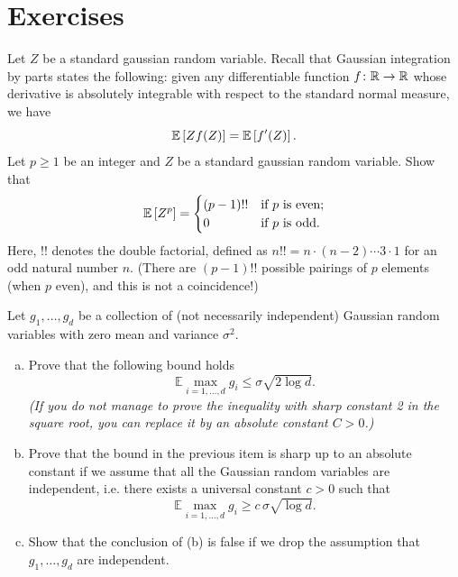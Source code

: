 \section*{Exercises}


\begin{myexercise}
    \label{prob:gaussian_moments}
    Let $Z$ be a standard gaussian random variable. Recall that Gaussian integration by parts states the following:
    given any differentiable function $f \colon \mathbb{R} \to \mathbb{R}$ whose derivative is absolutely integrable with respect to the standard normal measure, we have
    \begin{equation*}
        \mathbb{E}\left[ Zf(Z) \right] = \mathbb{E}\left[ f'(Z) \right].
    \end{equation*}
    Let $p \geq 1$ be an integer and $Z$ be a standard gaussian random variable. Show that
    \begin{equation*}
        \mathbb{E}\left[ Z^p \right] = \begin{cases}
            (p-1)!! &\text{if } p \text{ is even};\\
            0 &\text{if } p \text{ is odd}.
        \end{cases}
    \end{equation*}
    Here, $!!$ denotes the double factorial, defined as $n!! = n \cdot (n-2) \cdots 3 \cdot 1$ for an odd natural number $n$.
    (There are $(p-1)!!$ possible pairings of $p$ elements (when $p$ even), and this is not a coincidence!)
\end{myexercise}


\begin{myexercise}
    \label{prob:maximum_gaussians}
     Let $g_1, \ldots, g_d$ be a collection of (not necessarily independent) Gaussian random variables with zero mean and variance $\sigma^2$.
    \begin{enumerate}[(a)]
        \item Prove that the following bound holds
        \begin{equation*}
            \mathbb{E}\max_{i=1,\ldots,d}g_i \le \sigma \sqrt{2\log d}.
        \end{equation*}
        \emph{(If you do not manage to prove the inequality with sharp constant 2 in the square root, you can replace it by an absolute constant $C>0$.)}
        
        \item Prove that the bound in the previous item is sharp up to an absolute constant if we assume that all the Gaussian random variables are independent, i.e. there exists a universal constant $c > 0$ such that
        \begin{equation*}
            \mathbb{E}\max_{i=1,\ldots,d}g_i \geq c\, \sigma \sqrt{\log d}.
        \end{equation*}
        
        \item Show that the conclusion of (b) is false if we drop the assumption that $g_1, \ldots, g_d$ are independent.
    \end{enumerate}
\end{myexercise}

